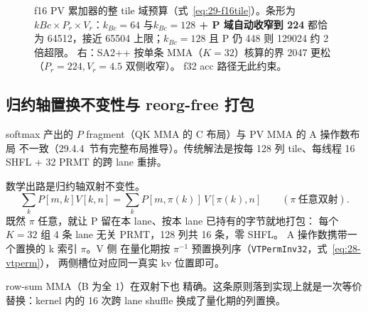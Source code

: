 \begin{figure}[H]
\caption{f16 PV 累加器的整 tile 域预算（式~\ref{eq:29-f16tile}）。条形为
$kBc\times P_r\times V_r$：$k_{Bc}{=}64$ 与\textbf{$k_{Bc}{=}128$ + P 域自动收窄到 224}
都恰为 64512，接近 65504 上限；$k_{Bc}{=}128$ 且 P 仍 448 则 129024 约 2 倍超限。
右：SA2++ 按单条 MMA（$K{=}32$）核算的界 2047 更松（$P_r{=}224,V_r{=}4.5$ 双侧收窄）。
f32 acc 路径无此约束。}
\label{fig:29-f16-budget}
\end{figure}

\subsection{归约轴置换不变性与 reorg-free 打包}\label{sec:29-perm}

softmax 产出的 $P$ fragment（QK MMA 的 C 布局）与 PV MMA 的 A 操作数布局
不一致（29.4.4~节有完整布局推导）。传统解法是按每 128 列 tile、每线程
16 SHFL + 32 PRMT 的跨 lane 重排。

数学出路是归约轴双射不变性。
\begin{equation}
  \sum_k P[m,k]V[k,n]=\sum_k P[m,\pi(k)]\,V[\pi(k),n]
  \qquad(\pi\ \text{任意双射}) .
  \label{eq:29-perm-inv}
\end{equation}
既然 $\pi$ 任意，就让 P 留在本 lane、按本 lane 已持有的字节就地打包：
每个 $K{=}32$ 组 4 条 lane 无关 PRMT，128 列共 16 条，零 SHFL。
A 操作数携带一个置换的 k 索引 $\pi$。V 侧
在量化期按 $\pi^{-1}$ 预置换列序（\texttt{VTPermInv32}，式~\ref{eq:28-vtperm}），
两侧槽位对应同一真实 kv 位置即可。

row-sum MMA（B 为全 1）在双射下也
精确。这条原则落到实现上就是一次等价替换：kernel 内的 16 次跨 lane shuffle
换成了量化期的列置换。

